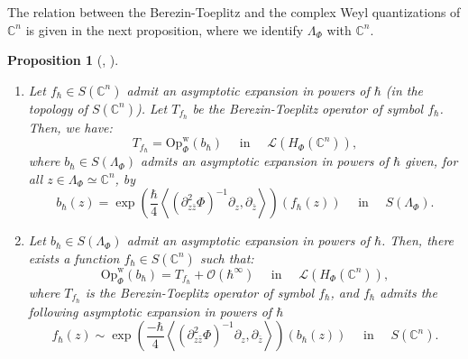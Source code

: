 \documentclass{article}
\newtheorem{prop}[theo]{Proposition}
\newcommand{\Op}{\mathrm{Op}}
\newcommand{\w}{\mathrm{w}}
\newcommand{\CM}{\mathbb{C}}
\newcommand{\h}{\hbar}
\begin{document}
The relation between the Berezin-Toeplitz and the complex Weyl
quantizations of $ \CM^n$ is given in the next proposition, where we
identify $\Lambda_\Phi$ with $\CM^n$.
\begin{prop}[{\cite[(1.23)]{sj-96}}, {\cite[Theorem
    13.10]{zworski-book-12}}] \label{prop_Toeplitz=pseudo_H(Phi)} $ $
  \begin{enumerate}[label=\roman*)]
  \item \label{item:f-to-b} Let $f_{\hbar} \in S( \CM^n)$ admit an
    asymptotic expansion in powers of $\hbar$ (in the topology of
    $S(\CM^n)$). Let $T_{f_{\hbar}}$ be the Berezin-Toeplitz operator
    of symbol $f_{\hbar}$. Then, we have:
    \[
      T_{f_{\hbar}} = \Op^{\w}_{ \Phi}( b_{ \hbar}) \quad \text{ in }
      \quad \mathcal{L}(H_{\Phi}( \CM^n)),
    \]
    where $b_{ \hbar} \in S( \Lambda_{ \Phi})$ admits an asymptotic
    expansion in powers of $\hbar$ given, for all
    $z \in \Lambda_{ \Phi} \simeq \CM^n$, by
    \begin{equation}
      \label{equ:f-to-b}
      b_{ \hbar}(z) = \exp \left( \dfrac{\hbar}{4} \left\langle
          \left( \partial^2_{z \bar{z}} \Phi
          \right)^{-1} \partial_z, \partial_{ \bar{z}}
        \right\rangle \right) ( f_{\hbar}(z)) \quad \text{ in } \quad
      S(\Lambda_{\Phi}).
    \end{equation}

  \item \label{item:b-to-f} Let $b_{ \hbar} \in S( \Lambda_{ \Phi})$
    admit an asymptotic expansion in powers of $ \hbar$. Then, there
    exists a function $f_{\hbar} \in S( \CM^n)$ such that:
    \[
      \Op^{\w}_{ \Phi}(b_{ \hbar}) = T_{f_{\hbar}} +
      \mathcal{O}(\hbar^{\infty}) \quad \text{ in } \quad
      \mathcal{L}(H_{\Phi}( \CM^n)),
    \]
    where $T_{f_{\hbar}}$ is the Berezin-Toeplitz operator of symbol
    $f_{\hbar}$, and $f_\h$ admits the following asymptotic expansion
    in powers of $\hbar$
    \begin{equation}
      \label{equ:b-to-f}
      f_{ \hbar}(z) \sim \exp \left( \dfrac{-\hbar}{4} \left\langle
          \left( \partial^2_{z \bar{z}} \Phi
          \right)^{-1} \partial_z, \partial_{ \bar{z}} \right\rangle
      \right) ( b_{\hbar}(z)) \quad \text{ in } \quad S(\CM^n).
    \end{equation}
  \end{enumerate}
\end{prop}
\end{document}

